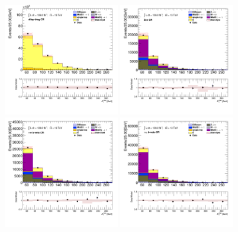 		\begin{figure}[!htp]
			\begin{center}    
			\includegraphics[width=0.45\textwidth]{chapters/chapter6_HPlus/images/taulep/met_et_DILEP_BTAG.png}
			\includegraphics[width=0.45\textwidth]{chapters/chapter6_HPlus/images/taulep/met_et_ZEE.png} \\
			\includegraphics[width=0.45\textwidth]{chapters/chapter6_HPlus/images/taulep/met_et_TAUEL_BVETO.png} 
			\includegraphics[width=0.45\textwidth]{chapters/chapter6_HPlus/images/taulep/met_et_TAUMU_BVETO.png} \\

\end{center}
\end{figure}
